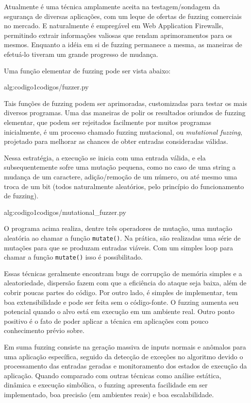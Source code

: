 Atualmente é uma técnica amplamente aceita na testagem/sondagem da segurança de diversas aplicações, com um leque de ofertas de fuzzing comerciais no mercado. E naturalmente é empregável em Web Application Firewalls, permitindo extrair informações valiosas que rendam aprimoramentos para os mesmos. Enquanto a idéia em si de fuzzing permanece a mesma, as maneiras de efetuá-lo tiveram um grande progresso de mudança.


Uma função elementar de fuzzing pode ser vista abaixo:

 {alg:codigo1}{codigos/fuzzer.py}

\bigskip
Tais funções de fuzzing podem ser aprimoradas, customizadas para testar os mais diversos programas. Uma das maneiras de polir os resultados oriundos de fuzzing elementar, que podem ser rejeitados facilmente por muitos programas inicialmente, é um processo chamado fuzzing mutacional, ou \textit{mutational fuzzing}, projetado para melhorar as chances de obter entradas consideradas válidas.

Nessa estratégia, a execução se inicia com uma entrada válida, e ela subsequentemente sofre uma mutação pequena, como no caso de uma string a mudança de um caractere, adição/remoção de um número, ou até mesmo uma troca de um bit (todos naturalmente aleatórios, pelo princípio do funcionamento de fuzzing).

 {alg:codigo1}{codigos/mutational_fuzzer.py}

\bigskip
O programa acima realiza, dentre três operadores de mutação, uma mutação aleatória ao chamar a função \verb+mutate()+. Na prática, são realizadas uma série de mutações para que se produzam entradas viáveis. Com um simples loop para chamar a função \verb+mutate()+ isso é possibilitado.

Essas técnicas geralmente encontram bugs de corrupção de memória simples e a aleatoriedade, dispersão fazem com que a eficiência do ataque seja baixa, além de cobrir poucas partes do código. Por outro lado, é simples de implementar, tem boa extensibilidade e pode ser feita sem o código-fonte. O fuzzing aumenta seu potencial quando o alvo está em execução em um ambiente real. Outro ponto positivo é o fato de poder aplicar a técnica em aplicações com pouco conhecimento prévio sobre.

Em suma fuzzing consiste na geração massiva de inputs normais e anômalos para uma aplicação específica, seguido da detecção de exceções no algoritmo devido o processamento das entradas geradas e monitoramento dos estados de execução da aplicação. Quando comparado com outras técnicas como análise estática, dinâmica e execução simbólica, o fuzzing apresenta facilidade em ser implementado, boa precisão (em ambientes reais) e boa escalabilidade.

